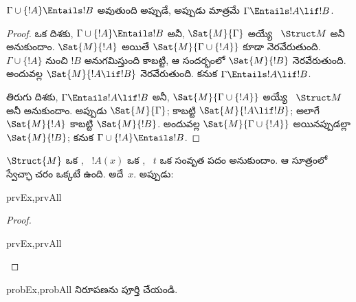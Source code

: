 \documentclass[../../../include/open-logic-section]{subfiles}
\begin{document}
\begin{thm}
$\Gamma \cup \{!A\} \Entails !B$ అవుతుంది అప్పుడే, అప్పుడు మాత్రమే
$\Gamma \Entails !A \lif !B$.
\end{thm}

\begin{proof}
ఒక దిశకు, $\Gamma \cup \{ !A \} \Entails !B$ అనీ,
$\Sat{M}{\Gamma}$ అయ్యే ~$\Struct M$ అనీ అనుకుందాం.
$\Sat{M}{!A}$ అయితే $\Sat{M}{\Gamma \cup \{ !A \} }$ కూడా నెరవేరుతుంది.
$\Gamma \cup \{ !A \}$ నుంచి $!B$ అనుగమిస్తుంది కాబట్టి, ఆ సందర్భంలో
$\Sat{M}{!B}$ నెరవేరుతుంది. అందువల్ల $\Sat{M}{!A \lif !B}$ నెరవేరుతుంది. కనుక
$\Gamma \Entails !A \lif !B$.

తిరుగు దిశకు, $\Gamma \Entails !A \lif !B$ అనీ,
$\Sat{M}{\Gamma \cup \{ !A \}}$ అయ్యే ~$\Struct M$
అనీ అనుకుందాం. అప్పుడు $\Sat{M}{\Gamma}$; కాబట్టి
$\Sat{M}{!A \lif !B}$; అలాగే $\Sat{M}{!A}$ కాబట్టి $\Sat{M}{!B}$.
అందువల్ల $\Sat{M}{\Gamma \cup \{ !A \} }$ అయినప్పుడల్లా
$\Sat{M}{!B}$; కనుక $\Gamma \cup \{ !A \} \Entails !B$.
\end{proof}

\begin{prop}
  $\Struct{M}$ ఒక , ~$!A(x)$ ఒక ,
  ~$t$ ఒక సంవృత పదం అనుకుందాం. ఆ సూత్రంలో స్వేచ్ఛా చరం ఒక్కటే ఉంది. అదే~$x$. అప్పుడు:
  \begin{tagenumerate}{prvEx,prvAll}
  \end{tagenumerate}
\end{prop}

\begin{proof}
  \begin{tagenumerate}{prvEx,prvAll}
  \end{tagenumerate}
\end{proof}

\begin{probtag}{probEx,probAll}
   నిరూపణను పూర్తి చేయండి.
\end{probtag}
\end{document}
